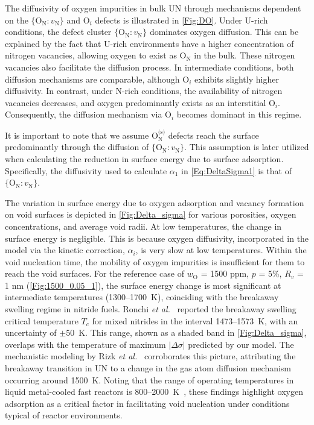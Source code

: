 \documentclass[preprint,12pt,sort&compress]{elsarticle}
\newcommand{\?}{\stackrel{?}{=}}
\begin{document}
The diffusivity of oxygen impurities in bulk UN through mechanisms dependent on the $\{\text{O}_\text{N} \! : \! v_\text{N}\}$ and $\text{O}_i$ defects is illustrated in \cref{Fig:DO}. Under U-rich conditions, the defect cluster $ \{\text{O}_\text{N} \! : \! v_\text{N}\} $ dominates oxygen diffusion. This can be explained by the fact that U-rich environments have a higher concentration of nitrogen vacancies, allowing oxygen to exist as $ \text{O}_\text{N} $ in the bulk. These nitrogen vacancies also facilitate the diffusion process. In intermediate conditions, both diffusion mechanisms are comparable, although $ \text{O}_i $ exhibits slightly higher diffusivity. In contrast, under N-rich conditions, the availability of nitrogen vacancies decreases, and oxygen predominantly exists as an interstitial $ \text{O}_i $. Consequently, the diffusion mechanism via $ \text{O}_i $ becomes dominant in this regime.

It is important to note that we assume $ \text{O}_\text{N}^\text{(s)} $ defects reach the surface predominantly through the diffusion of $ \{\text{O}_\text{N} \! : \! v_\text{N}\} $. This assumption is later utilized when calculating the reduction in surface energy due to surface adsorption. Specifically, the diffusivity used to calculate $\alpha_1$ in \cref{Eq:DeltaSigma1} is that of $ \{\text{O}_\text{N} \! : \! v_\text{N}\} $.

The variation in surface energy due to oxygen adsorption and vacancy formation on void surfaces is depicted in \cref{Fig:Delta_sigma} for various porosities, oxygen concentrations, and average void radii. At low temperatures, the change in surface energy is negligible. This is because oxygen diffusivity, incorporated in the model via the kinetic correction, $\alpha_i$, is very slow at low temperatures. Within the void nucleation time, the mobility of oxygen impurities is insufficient for them to reach the void surfaces. For the reference case of $w_\text{O}$ = 1500 ppm, $p$ = 5\%, $R_v$ = 1 nm (\cref{Fig:1500_0.05_1}), the surface energy change is most significant at intermediate temperatures (1300--1700~K), coinciding with the breakaway swelling regime in nitride fuels. Ronchi \textit{et al.}~\cite{Ronchi1978} reported the breakaway swelling critical temperature $T_c$ for mixed nitrides in the interval 1473--1573~K, with an uncertainty of $\pm$50~K. This range, shown as a shaded band in \cref{Fig:Delta_sigma}, overlaps with the temperature of maximum $|\Delta \sigma|$ predicted by our model. The mechanistic modeling by Rizk \textit{et al.}~\cite{Rizk2025} corroborates this picture, attributing the breakaway transition in UN to a change in the gas atom diffusion mechanism occurring around 1500~K. Noting that the range of operating temperatures in liquid metal-cooled fast reactors is 800--2000~K~\cite{Turos1990}, these findings highlight oxygen adsorption as a critical factor in facilitating void nucleation under conditions typical of reactor environments.
\end{document}
